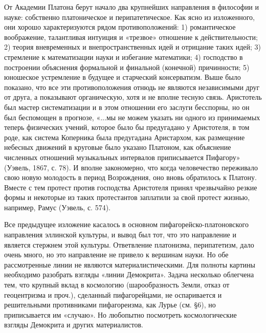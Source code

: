 От  Академии  Платона  берут   начало  два  крупнейших  направления  в
философии  и  науке:   собственно  платоническое  и  перипатетическое.
Как   ясно   из   изложенного,  они   хорошо   характеризуются   рядом
противоположений: 1) романтическое воображение, талантливая интуиция и
«трезвое»  отношение  к  действительности; 2)  теория  вневременных  и
внепространственных  идей  и отрицание  таких  идей;  3) стремление  к
математизации науки и избегание математики; 4) господство в построении
объяснения формальной и финальной (конечной) причинности; 5) юношеское
устремление в  будущее и старческий консерватизм.  Выше было показано,
что все эти  противоположения отнюдь не являются  независимыми друг от
друга,  а показывают  органическую,  хотя и  не  вполне тесную  связь.
Аристотель был  мастер систематизации и  в этом отношении  его заслуги
бесспорны, но он был беспомощен в прогнозе, «...мы не можем указать ни
одного  из  принимаемых  теперь  физических учений,  которое  было  бы
предугадано  у Аристотеля,  в  том роде,  как  система Коперника  была
предугадана Аристархом,  как размещение  небесных движений  в круговые
было указано Платоном, как  объяснение численных отношений музыкальных
интервалов  приписывается Пифагору»  (Уэвель, 1867,  с. 78).  И вполне
закономерно, что когда человечество  переживало свою новую молодость в
период  Возрождения, оно  вновь  обратилось к  Платону.  Вместе с  тем
протест против господства Аристотеля принял чрезвычайно резкие формы и
некоторые  из таких  протестантов  заплатили за  свой протест  жизнью,
например, Рамус (Уэвель, с. 574).

Все      предыдущее      изложение       касалось      в      основном
пифагорейско-платоновского  направления  эллинской культуры,  и  вывод
был  тот,  что это  направление  и  является стержнем  этой  культуры.
Ответвление  платонизма,  перипатетизм,  дало   очень  много,  но  это
направление не привело к вершинам науки. Но обе рассмотренные линии не
являются материалистическими. Для полноты картины необходимо разобрать
взгляды «линии Демокрита». Задача несколько облегчена тем, что крупный
вклад  в  космологию  (шарообразность  Земли,  отказ  от  геоцентризма
и  проч.), сделанный  пифагорейцами,  не  оспаривается и  решительными
противниками  пифагореизма, как  Лурье (см.  §6), но  приписывается им
«случаю». Но любопытно посмотреть  космологические взгляды Демокрита и
других материалистов.

